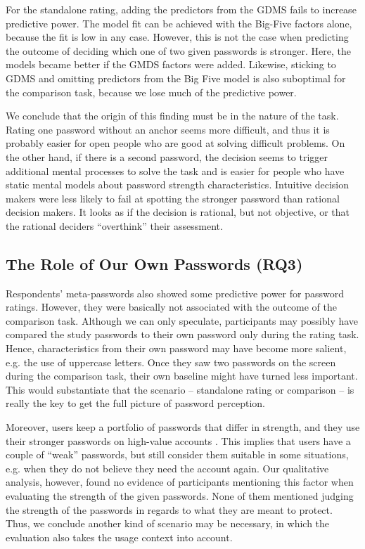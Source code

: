 For the standalone rating, adding the predictors from the GDMS fails to increase predictive power. The model fit can be achieved with the Big-Five factors alone, because the fit is low in any case. However, this is not the case when predicting the outcome of deciding which one of two given passwords is stronger. Here, the models became better if the GMDS factors were added. Likewise, sticking to GDMS and omitting predictors from the Big Five model is also suboptimal for the comparison task, because we lose much of the predictive power. 

We conclude that the origin of this finding must be in the nature of the task. Rating one password without an anchor seems more difficult, and thus it is probably easier for open people who are good at solving difficult problems. On the other hand, if there is a second password, the decision seems to trigger additional mental processes to solve the task and is easier for people who have static mental models about password strength characteristics. Intuitive decision makers were less likely to fail at spotting the stronger password than rational decision makers. It looks as if the decision is rational, but not objective, or that the rational deciders ``overthink'' their assessment. 


\subsection{The Role of Our Own Passwords (RQ3)}
Respondents' meta-passwords also showed some predictive power for password ratings. However, they were basically not associated with the outcome of the comparison task. %
Although we can only speculate, participants may possibly have compared the study passwords to their own password only during the rating task. Hence, characteristics from their own password may have become more salient, e.g. the use of uppercase letters. Once they saw two passwords on the screen during the comparison task, their own baseline might have turned less important. This would substantiate that the scenario -- standalone rating or comparison -- is really the key to get the full picture of password perception. %

Moreover, users keep a portfolio of passwords that differ in strength, and they use their stronger passwords on high-value accounts \cite{Egelman2013DoesMyPasswordGoUpToEleven,Florencio2007LargeScaleStudyPasswordHabits}. This implies that users have a couple of ``weak'' passwords, but still consider them suitable in some situations, e.g. when they do not believe they need the account again. Our qualitative analysis, however, found no evidence of participants mentioning this factor when evaluating the strength of the given passwords. None of them mentioned judging the strength of the passwords in regards to what they are meant to protect. Thus, we conclude another kind of scenario may be necessary, in which the evaluation also takes the usage context into account.

